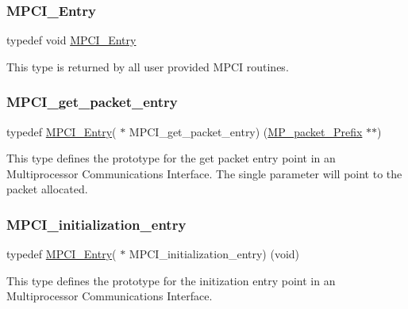\subsubsection{\texorpdfstring{MPCI\_Entry}{MPCI\_Entry}}
{\footnotesize\ttfamily typedef void \mbox{\hyperlink{group__RTEMSScoreMPCI_ga110fdd671fbc411706e2b281c1685816}{M\+P\+C\+I\+\_\+\+Entry}}}

This type is returned by all user provided M\+P\+CI routines. \mbox{\label{group__RTEMSScoreMPCI_gaff830d8b635714b2f669bfe612744244}} 
\subsubsection{\texorpdfstring{MPCI\_get\_packet\_entry}{MPCI\_get\_packet\_entry}}
{\footnotesize\ttfamily typedef \mbox{\hyperlink{group__RTEMSScoreMPCI_ga110fdd671fbc411706e2b281c1685816}{M\+P\+C\+I\+\_\+\+Entry}}( $\ast$ M\+P\+C\+I\+\_\+get\+\_\+packet\+\_\+entry) (\mbox{\hyperlink{structMP__packet__Prefix}{M\+P\+\_\+packet\+\_\+\+Prefix}} $\ast$$\ast$)}

This type defines the prototype for the get packet entry point in an Multiprocessor Communications Interface. The single parameter will point to the packet allocated. \mbox{\label{group__RTEMSScoreMPCI_ga40ecc89f5ace847ed93f57e06ef0f27c}} 
\subsubsection{\texorpdfstring{MPCI\_initialization\_entry}{MPCI\_initialization\_entry}}
{\footnotesize\ttfamily typedef \mbox{\hyperlink{group__RTEMSScoreMPCI_ga110fdd671fbc411706e2b281c1685816}{M\+P\+C\+I\+\_\+\+Entry}}( $\ast$ M\+P\+C\+I\+\_\+initialization\+\_\+entry) (void)}

This type defines the prototype for the initization entry point in an Multiprocessor Communications Interface. \mbox{\label{group__RTEMSScoreMPCI_gafc97753e25c76740b182f3e8cdf74cc8}} 
